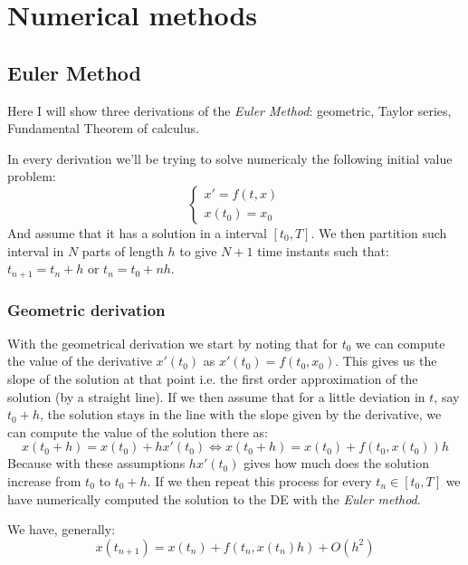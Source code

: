 \documentclass[../ode.tex]{subfiles}
\begin{document}
    \chapter{\sffamily Numerical methods}
    
    \section{\sffamily Euler Method}
    Here I will show three derivations of the \emph{Euler Method}: geometric, Taylor series, Fundamental Theorem of calculus.

    In every derivation we'll be trying to solve numericaly the following initial value problem:
    \begin{equation*}
        \begin{cases}
            x'=f(t,x)\\
            x(t_0) = x_0
        \end{cases}
    \end{equation*}
    And assume that it has a solution in a interval $[t_0,T]$. We then partition such interval in $N$ parts of length $h$ to give
    $N+1$ time instants such that: $t_{n+1} = t_{n} + h$ or $t_n = t_0+nh$.
    
    \subsection{\sffamily Geometric derivation}
    
    With the geometrical derivation we start by noting that for $t_0$ we can compute the value of the derivative $x'(t_0)$ as
    $x'(t_0) = f(t_0,x_0)$. This gives us the slope of the solution at that point i.e. the first order approximation of the
    solution (by a straight line). If we then assume that for a little deviation in $t$, say $t_0+h$, the solution stays in the
    line with the slope given by the derivative, we can compute the value of the solution there as:
    \begin{equation*}
        x(t_0+h) = x(t_0) + hx'(t_0) \iff x(t_0 + h) = x(t_0) + f(t_0, x(t_0)) h
    \end{equation*}
    Because with these assumptions $hx'(t_0)$ gives how much does the solution increase from $t_0$ to $t_0+h$. If we then repeat
    this process for every $t_n \in [t_0,T]$ we have numerically computed the solution to the DE with the \emph{Euler method}. 

    We have, generally:
    \begin{equation*}
        x(t_{n+1}) = x(t_n) + f(t_n, x(t_n)h) + O(h^{2})
    \end{equation*}
    
\end{document}
